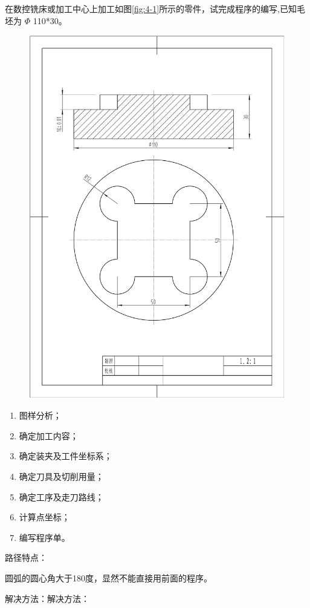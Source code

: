 在数控铣床或加工中心上加工如图\ref{fig:4-1}所示的零件，试完成程序的编写,已知毛坯为 $\Phi$ 110*30。

\begin{figure}[h]
    \centering
    \includegraphics[width=0.8\linewidth,trim=50 150 50 100,clip]{data/image/5-2.jpg}
    \caption{}
    \label{fig:5-2}
\end{figure}

\begin{enumerate}[1、]
    \item 图样分析；
    \item 确定加工内容；
    \item 确定装夹及工件坐标系；
    \item 确定刀具及切削用量；
    \item 确定工序及走刀路线；
    \item 计算点坐标；
    \item 编写程序单。
\end{enumerate}


路径特点：

圆弧的圆心角大于180度，显然不能直接用前面的程序。

解决方法：解决方法：



